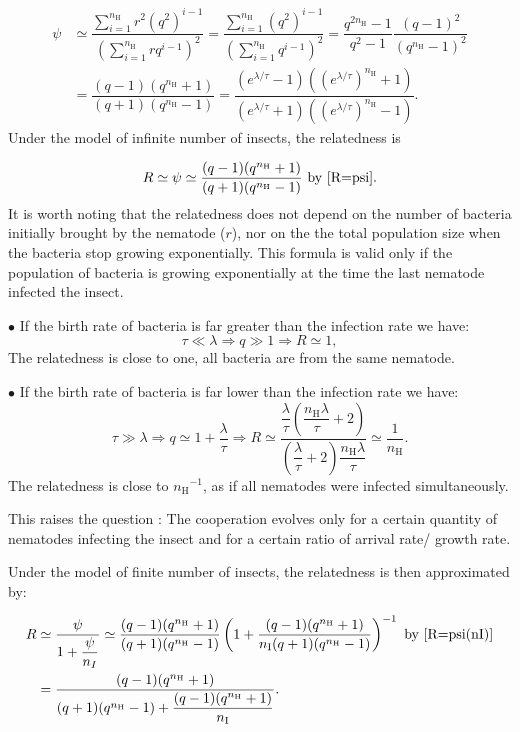 \documentclass{article}
\newcommand{\nN}{{n_\textrm{H}}}
\newcommand{\nI}{{n_\textrm{I}}}
\begin{document}
 \begin{align}
  \psi &\simeq \dfrac{ \sum_{i=1}^\nN r^2 (q^2)^{i-1}}{\left(\sum_{i=1}^\nN r q^{i-1}\right)^2} = \dfrac{ \sum_{i=1}^\nN (q^2)^{i-1}}{\left(\sum_{i=1}^\nN q^{i-1}\right)^2}= \dfrac{q^{2\nN} -1 }{q^{2} -1 } \dfrac{(q-1)^2}{(q^\nN -1)^2} \\
  &= \dfrac{(q-1)(q^\nN +1)}{(q+1)(q^\nN -1)} = \dfrac{(e^{  \lambda / \tau}-1)((e^{\lambda / \tau})^\nN +1)}{(e^{\lambda / \tau}+1)((e^{\lambda / \tau})^\nN -1)}.
 \end{align}
 Under the model of infinite number of insects, the relatedness is 
 
 \begin{equation}
 R \simeq \psi \simeq  \dfrac{(q-1)(q^\nN +1)}{(q+1)(q^\nN -1)} \text{ by }\eqref{R=psi}.
 \end{equation}
 It is worth noting that the relatedness does not depend on the number of bacteria initially brought by the nematode ($r$), nor on the the total population size when the bacteria stop growing exponentially. 
 This formula is valid only if the population of bacteria is growing exponentially at the time the last nematode infected the insect.
 
 $\bullet$ If the birth rate of bacteria is far greater than the infection rate we have:
 \begin{equation}
 \tau \ll \lambda \Rightarrow q \gg 1 \Rightarrow R \simeq 1,
 \end{equation}
 The relatedness is close to one, all bacteria are from the same nematode.
 
 
 $\bullet$ If the birth rate of bacteria is far lower than the infection rate we have:
 \begin{equation}
 \tau \gg \lambda \Rightarrow q \simeq 1 + \frac{\lambda }{\tau } \Rightarrow R \simeq 
  \dfrac{\dfrac{\lambda}{\tau}\left( \dfrac{\nN\lambda}{\tau} +2\right)}{\left( \dfrac{\lambda}{\tau} +2\right)\dfrac{\nN\lambda}{\tau}} \simeq \dfrac{1}{\nN}.
 \end{equation}
  The relatedness is close to $\nN^{-1}$, as if all nematodes were infected simultaneously.
  
  This raises the question : The cooperation evolves only for a certain quantity of nematodes infecting the insect and for a certain ratio of arrival rate/ growth rate.

Under the model of finite number of insects, the relatedness is then approximated by: 
 
 \begin{align}
  R & \simeq \dfrac{\psi}{1+ \dfrac{\psi}{n_{I}}} \simeq \dfrac{(q-1)(q^\nN +1)}{(q+1)(q^\nN -1)} \left( 1+ \dfrac{(q-1)(q^\nN +1)}{\nI (q+1)(q^\nN -1)} \right)^{-1} \text{ by }\eqref{R=psi(nI)}\\
    &= \dfrac{(q-1)(q^\nN+1)}{ (q+1)(q^\nN -1)+ \dfrac{(q-1)(q^\nN +1)}{\nI}}.
 \end{align}
 
\end{document}
